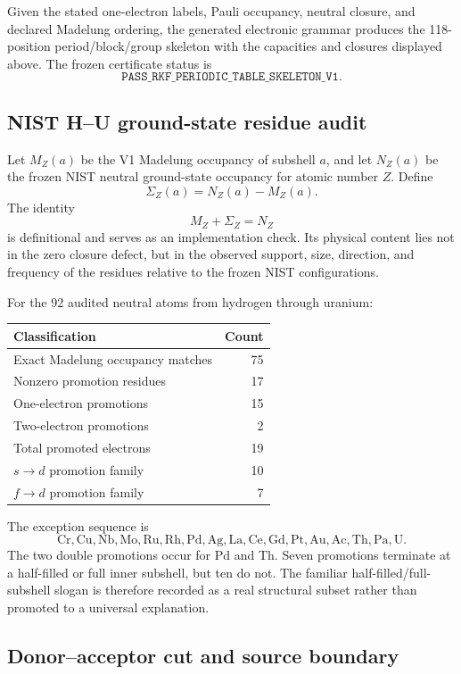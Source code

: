 \begin{proposition}
Given the stated one-electron labels, Pauli occupancy, neutral closure, and declared Madelung ordering, the generated electronic grammar produces the 118-position period/block/group skeleton with the capacities and closures displayed above. The frozen certificate status is
\[
 \texttt{PASS\_RKF\_PERIODIC\_TABLE\_SKELETON\_V1}.
\]
\end{proposition}

\subsection{NIST H--U ground-state residue audit}

Let $M_Z(a)$ be the V1 Madelung occupancy of subshell $a$, and let $N_Z(a)$ be the frozen NIST neutral ground-state occupancy for atomic number $Z$. Define
\[
 \Sigma_Z(a)=N_Z(a)-M_Z(a).
\]
The identity
\[
 M_Z+\Sigma_Z=N_Z
\]
is definitional and serves as an implementation check. Its physical content lies not in the zero closure defect, but in the observed support, size, direction, and frequency of the residues relative to the frozen NIST configurations.

For the 92 audited neutral atoms from hydrogen through uranium:
\begin{center}
\begin{tabular}{lr}
\toprule
Classification & Count\\
\midrule
Exact Madelung occupancy matches & 75\\
Nonzero promotion residues & 17\\
One-electron promotions & 15\\
Two-electron promotions & 2\\
Total promoted electrons & 19\\
$s\to d$ promotion family & 10\\
$f\to d$ promotion family & 7\\
\bottomrule
\end{tabular}
\end{center}
The exception sequence is
\[
\mathrm{Cr,Cu,Nb,Mo,Ru,Rh,Pd,Ag,La,Ce,Gd,Pt,Au,Ac,Th,Pa,U}.
\]
The two double promotions occur for Pd and Th. Seven promotions terminate at a half-filled or full inner subshell, but ten do not. The familiar half-filled/full-subshell slogan is therefore recorded as a real structural subset rather than promoted to a universal explanation.

\subsection{Donor--acceptor cut and source boundary}


